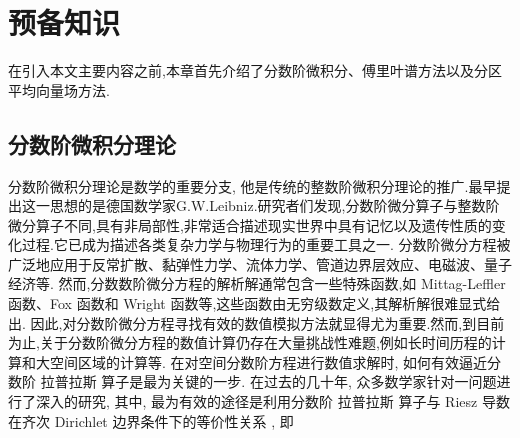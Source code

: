 \chapter[预备知识]{预备知识}

在引入本文主要内容之前,本章首先介绍了分数阶微积分、傅里叶谱方法以及分区平均向量场方法.
\section{分数阶微积分理论}
分数阶微积分理论是数学的重要分支, 他是传统的整数阶微积分理论的推广.最早提出这一思想的是德国数学家G.W.Leibniz.研究者们发现,分数阶微分算子与整数阶微分算子不同,具有非局部性,非常适合描述现实世界中具有记忆以及遗传性质的变化过程.它已成为描述各类复杂力学与物理行为的重要工具之一.
分数阶微分方程被广泛地应用于反常扩散、黏弹性力学、流体力学、管道边界层效应、电磁波、量子经济等.
然而,分数数阶微分方程的解析解通常包含一些特殊函数,如 Mittag-Leffler 函数、Fox 函数和 Wright 函数等,这些函数由无穷级数定义,其解析解很难显式给出.
因此,对分数阶微分方程寻找有效的数值模拟方法就显得尤为重要.然而,到目前为止,关于分数阶微分方程的数值计算仍存在大量挑战性难题,例如长时间历程的计算和大空间区域的计算等.
在对空间分数阶方程进行数值求解时, 如何有效逼近分数阶 拉普拉斯 算子是最为关键的一步. 
在过去的几十年, 众多数学家针对一问题进行了深入的研究, 其中, 最为有效的途径是利用分数阶 拉普拉斯 算子与 Riesz 导数在齐次 Dirichlet 边界条件下的等价性关系 \cite{yangNumericalMethodsFractional2010,demengelFunctionalSpacesTheory2012}, 即
